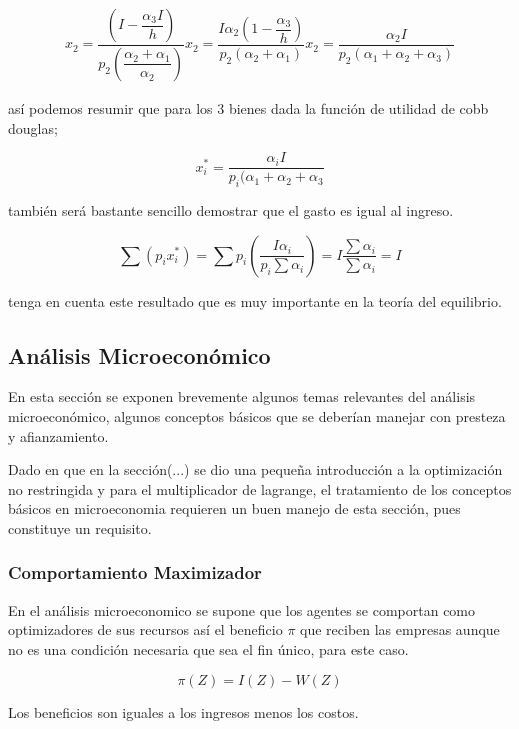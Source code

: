\documentclass[12pt]{article}
\begin{document}
\begin{eqnarray}


x_{2}= \dfrac{  (I-\dfrac{\alpha_{3}I}{h})}{p_{2}(\dfrac{\alpha_{2} + \alpha_{1}}{\alpha_{2}})}

x_{2} = \dfrac{ I \alpha_{2}(1-\dfrac{\alpha_{3}}{h})}{p_{2}( \alpha_{2}+\alpha_{1})}

x_{2}=\dfrac{\alpha_{2}I}{p_{2}(\alpha_{1}+\alpha_{2}+\alpha_{3})}


\end{eqnarray}

así podemos resumir que para los 3 bienes dada la función de utilidad de cobb douglas; 

$$x_{i}^{*}=\dfrac{\alpha_{i}I}{p_{i}(\alpha_{1}+\alpha_{2}+\alpha_{3}}$$

también será bastante sencillo demostrar que el gasto es igual al ingreso.


$$ \sum(p_{i}x_{i}^{*})=\sum p_{i}(\dfrac{I \alpha_{i}}{p_{i}\sum\alpha_{i} }) = I \dfrac{\sum \alpha_{i}}{\sum \alpha_{i}}=I $$


tenga en cuenta este resultado que es muy importante en la teoría del equilibrio.




\subsection*{Análisis Microeconómico}

En esta sección se exponen brevemente algunos temas relevantes del análisis microeconómico, algunos conceptos básicos que se deberían manejar con presteza  y afianzamiento.

Dado en que en la sección(...) se dio una pequeña introducción a la optimización no restringida y para el multiplicador de lagrange,  el tratamiento de los conceptos básicos en microeconomia requieren un buen manejo de esta sección, pues constituye un requisito.

\subsubsection*{Comportamiento Maximizador}

En el análisis microeconomico se supone que los agentes se comportan como optimizadores de sus recursos así el beneficio $\pi$ que reciben las empresas aunque no es una condición necesaria que sea el fin único, para este caso.


$$\pi(Z)=I(Z)-W(Z)$$

Los beneficios son iguales a los ingresos menos los costos.
\end{document}
